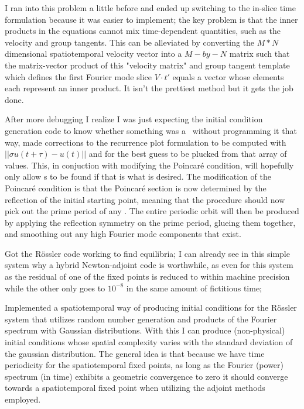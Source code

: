 I ran into this problem a little before and ended up switching to the in-slice time formulation
because it was easier to implement; the key problem is that the inner products in the equations
cannot mix time-dependent quantities, such as the velocity and group tangents. This can be
alleviated by converting the $M*N$ dimensional spatiotemporal velocity vector into a $M-by-N$ matrix
such that the matrix-vector product of this "velocity matrix" and group tangent template which
defines the first Fourier mode slice $V \cdot t'$ equals a vector whose elements each represent an
inner product. It isn't the prettiest method but it gets the job done.



After more debugging I realize I was just expecting the initial condition generation
code to know whether something was a \ppo\ without programming it that way,
made corrections to the recurrence plot formulation to be computed with
$||\sigma u(t + \tau) - u(t)||$ and for the best guess to be plucked from that array of
values. This, in conjuction with modifying the Poincar\'e condition, will hopefully
only allow {\ppo}s to be found if that is what is desired. The modification of the
Poincar\'e condition is that the Poincar\'e section is now determined by the reflection
of the initial starting point, meaning that the procedure should now pick out the prime
period of any \ppo. The entire periodic orbit will then be produced by applying the
reflection symmetry on the prime period, glueing them together, and smoothing out
any high Fourier mode components that exist.

Got the R\"ossler code working to find equilibria; I can already see in this
simple system why a hybrid Newton-adjoint code is worthwhile, as even for this system
as the residual of one of the fixed points is reduced to within machine precision
while the other only goes to $10^{-8}$ in the same amount of fictitious time;


Implemented a spatiotemporal way of producing initial conditions for the R\"ossler system that utilizes
random number generation and products of the Fourier spectrum with Gaussian distributions. With this I can produce
(non-physical) initial conditions whose spatial complexity varies with the standard deviation
of the gaussian distribution. The general idea is that because we have time periodicity for the spatiotemporal
fixed points, as long as the Fourier (power) spectrum (in time) exhibits a geometric convergence to zero it
should converge towards a spatiotemporal fixed point when utilizing the adjoint methods employed.

